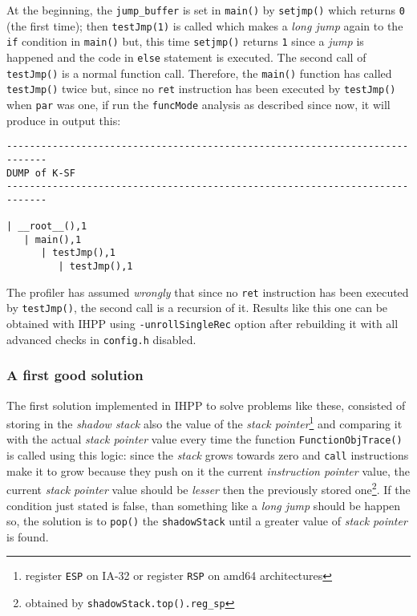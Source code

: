 \documentclass[a4paper,10pt]{report}
\begin{document}
\noindent
At the beginning, the \verb|jump_buffer| is set in \verb|main()| by \verb|setjmp()|
which returns \verb|0| (the first time);
then \verb|testJmp(1)| is called which makes a \emph{long jump}
again to the \verb|if| condition in \verb|main()| but, this time \verb|setjmp()| returns
\verb|1| since a \emph{jump} is happened and the code in \verb|else| statement
is executed. The second call of \verb|testJmp()| is a normal function call.
Therefore, the \verb|main()| function has called \verb|testJmp()| twice but,
since no \verb|ret| instruction has been executed by \verb|testJmp()| when \verb|par|
was one, if run the \verb|funcMode| analysis as described since now, it will produce
in output this:

\begin{lstlisting}[label=longjmp_ex_1, caption={an example of the \emph{longjmp} problem}]
-----------------------------------------------------------------------------
DUMP of K-SF
-----------------------------------------------------------------------------

| __root__(),1
   | main(),1
      | testJmp(),1
         | testJmp(),1
\end{lstlisting}

\noindent
The profiler has assumed \emph{wrongly} that since no \verb|ret| instruction
has been executed by \verb|testJmp()|, the second call is a recursion of it.
Results like this one can be obtained with IHPP using \verb|-unrollSingleRec| option
after rebuilding it with all advanced checks in \verb|config.h| disabled.

\subsubsection{A first good solution}
The first solution implemented in IHPP to solve problems like these,
consisted of storing in the \emph{shadow stack} also
the value of the \emph{stack pointer}\footnote{register \texttt{ESP} on IA-32 or register \texttt{RSP} on amd64 architectures} and comparing it with the actual \emph{stack pointer}
value every time the function \verb|FunctionObjTrace()| is called using this logic:
since the \emph{stack} grows towards zero and \verb|call| instructions make
it to grow because they push on it the current \emph{instruction pointer} value,
the current \emph{stack pointer} value should be \emph{lesser} then the previously
stored one\footnote{obtained by \texttt{shadowStack.top().reg\_sp}}.
If the condition just stated is false, than something like a \emph{long jump} should be
happen so, the solution is to \verb|pop()| the \verb|shadowStack| until a greater
value of \emph{stack pointer} is found.
\end{document}
